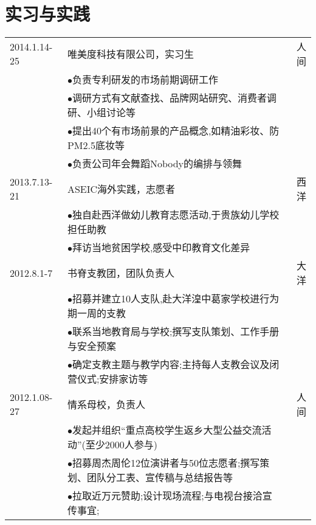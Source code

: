 \documentclass[a4paper]{article} %
\begin{document}

\section{实习与实践}

\begin{tabular}{llr}
\rowcolor{mypink}
	2014.1.14-25&  唯美度科技有限公司，实习生& 人间\\
& $\bullet$负责专利研发的市场前期调研工作&\\
& $\bullet$调研方式有文献查找、品牌网站研究、消费者调研、小组讨论等&\\
& $\bullet$提出40个有市场前景的产品概念,如精油彩妆、防PM2.5底妆等&\\
& $\bullet$负责公司年会舞蹈Nobody的编排与领舞&\\


	\rowcolor{mypink}
2013.7.13-21&ASEIC海外实践，志愿者&西洋\\
& $\bullet$独自赴西洋做幼儿教育志愿活动,于贵族幼儿学校担任助教&\\
& $\bullet$拜访当地贫困学校,感受中印教育文化差异&\\


	\rowcolor{mypink}
2012.8.1-7&书脊支教团，团队负责人&大洋\\
 & $\bullet$招募并建立10人支队,赴大洋湟中葛家学校进行为期一周的支教&\\
 & $\bullet$联系当地教育局与学校;撰写支队策划、工作手册与安全预案&\\
 & $\bullet$确定支教主题与教学内容;主持每人支教会议及闭营仪式;安排家访等&\\



	\rowcolor{mypink}
2012.1.08-27&情系母校，负责人&人间\\
 & $\bullet$发起并组织“重点高校学生返乡大型公益交流活动”(至少2000人参与)&\\
 & $\bullet$招募周杰周伦12位演讲者与50位志愿者;撰写策划、团队分工表、宣传稿与总结报告等&\\
 & $\bullet$拉取近万元赞助;设计现场流程;与电视台接洽宣传事宜;&\\


\end{tabular}

\end{document}

